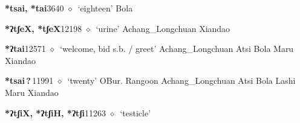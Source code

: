   \begin{list}{}{\leftmargin=1.5em \itemindent=-1.5em}
  \item {\footnotesize \textbf{*tsai, *tai}}{\tiny 3640}
         $\diamond$~`eighteen'
         Bola 
  \item {\footnotesize \textbf{*ʔtʃeX, *tʃeX}}{\tiny 12198}
\hspace{1ex}
         $\diamond$~`urine'
         Achang\_Longchuan 
\hspace{1ex}
         Xiandao 
  \item {\footnotesize \textbf{*ʔtai}}{\tiny 12571}
\hspace{1ex}
         $\diamond$~`welcome, bid s.b. / greet'
         Achang\_Longchuan 
\hspace{1ex}
         Atsi 
\hspace{1ex}
         Bola 
\hspace{1ex}
         Maru 
\hspace{1ex}
         Xiandao 
  \item {\footnotesize \textbf{*tsai\,?\,}}{\tiny 11991}
\hspace{1ex}
         $\diamond$~`twenty'
         OBur. 
\hspace{1ex}
         Rangoon 
\hspace{1ex}
         Achang\_Longchuan 
\hspace{1ex}
         Atsi 
\hspace{1ex}
         Bola 
\hspace{1ex}
         Lashi 
\hspace{1ex}
         Maru 
\hspace{1ex}
         Xiandao 
  \item {\footnotesize \textbf{*ʔtʃiX, *ʔtʃiH, *ʔtʃi}}{\tiny 11263}
\hspace{1ex}
         $\diamond$~`testicle'

\end{list}
